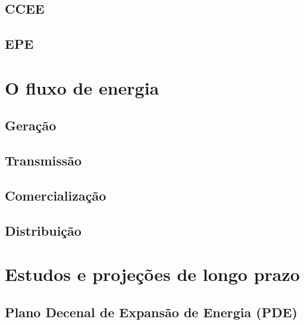 \documentclass[grad,numbers]{coppe}
\begin{document}
  \hypertarget{ccee}{%
  \subsection{CCEE}\label{ccee}}
  
  \hypertarget{epe}{%
  \subsection{EPE}\label{epe}}
  
  \hypertarget{o-fluxo-de-energia}{%
  \section{O fluxo de energia}\label{o-fluxo-de-energia}}
  
  \hypertarget{gerauxe7uxe3o}{%
  \subsection{Geração}\label{gerauxe7uxe3o}}
  
  \hypertarget{transmissuxe3o}{%
  \subsection{Transmissão}\label{transmissuxe3o}}
  
  \hypertarget{comercializauxe7uxe3o}{%
  \subsection{Comercialização}\label{comercializauxe7uxe3o}}
  
  \hypertarget{distribuiuxe7uxe3o}{%
  \subsection{Distribuição}\label{distribuiuxe7uxe3o}}
  
  \hypertarget{estudos-e-projeuxe7uxf5es-de-longo-prazo}{%
  \section{Estudos e projeções de longo prazo}\label{estudos-e-projeuxe7uxf5es-de-longo-prazo}}
  
  \hypertarget{plano-decenal-de-expansuxe3o-de-energia-pde}{%
  \subsection{Plano Decenal de Expansão de Energia (PDE)}\label{plano-decenal-de-expansuxe3o-de-energia-pde}}
  
\end{document}

